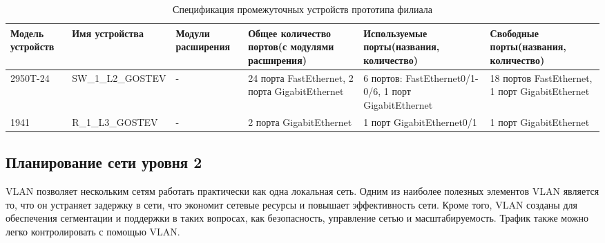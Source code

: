 \documentclass[14pt, a4paper]{extarticle}
\numberwithin{equation}{section}
\begin{document}
\begin{landscape}
\begin{table}[H]
\centering
\small
\caption{Спецификация промежуточных устройств прототипа филиала}
\begin{tabular}{|m{2.5cm}|m{4cm}|m{3cm}|m{4.2cm}|m{5.3cm}|m{4cm}|}
\hline
\textbf{Модель устройств} & \textbf{Имя устройства} & \textbf{Модули расширения} & \textbf{Общее количество портов(с модулями расширения)} & \textbf{Используемые порты(названия, количество)} & \textbf{Свободные порты(названия, количество)} \\
\hline
2950T-24 &
SW\_1\_L2\_GOSTEV &
- &
24 порта FastEthernet, 2 порта GigabitEthernet &
6 портов: FastEthernet0/1-0/6, 1 порт GigabitEthernet &
18 портов FastEthernet, 1 порт GigabitEthernet \\
\hline
1941 &
R\_1\_L3\_GOSTEV &
- &
2 порта GigabitEthernet &
1 порт GigabitEthernet0/1 &
1 порт GigabitEthernet \\
\hline
\end{tabular}
\end{table}
\end{landscape}



\subsection{Планирование сети уровня 2}

VLAN позволяет нескольким сетям работать практически как одна локальная сеть. Одним из наиболее полезных элементов VLAN является то, что он устраняет задержку в сети, что экономит сетевые ресурсы и повышает эффективность сети. Кроме того, VLAN созданы для обеспечения сегментации и поддержки в таких вопросах, как безопасность, управление сетью и масштабируемость. Трафик также можно легко контролировать с помощью VLAN.
\end{document}
